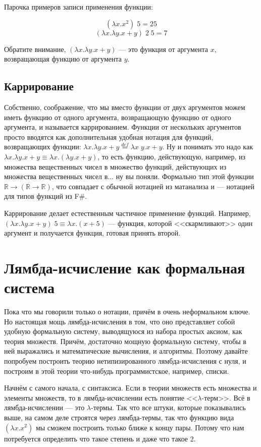 \documentclass[a5paper]{article}
\begin{document}
Парочка примеров записи применения функции:

$$(\lambda x.x^2) \; 5 = 25$$
$$(\lambda x.\lambda y.x + y) \; 2 \; 5 = 7$$

Обратите внимание, $(\lambda x.\lambda y.x + y)$ --- это функция от аргумента $x$, возвращающая функцию от аргумента $y$.

\subsection{Каррирование}

Собственно, соображение, что мы вместо функции от двух аргументов можем иметь функцию от одного аргумента, возвращающую функцию от одного аргумента, и называется каррированием. Функции от нескольких аргументов просто вводятся как дополнительная удобная нотация для функций, возвращающих функции: $\lambda x.\lambda y.x + y \stackrel{def}{=} \lambda x \; y.x + y$. Ну и понимать это надо как $\lambda x.\lambda y.x + y \equiv \lambda x.(\lambda y.x + y)$, то есть функцию, действующую, например, из множества вещественных чисел в множество функций, действующих из множества вещественных чисел в... ну вы поняли. Формально тип этой функции $\mathbb{R} \rightarrow (\mathbb{R} \rightarrow \mathbb{R})$, что совпадает с обычной нотацией из матанализа и --- нотацией для типов функций из F\#.

Каррирование делает естественным частичное применение функций. Например, $(\lambda x.\lambda y.x + y) \; 5 \equiv \lambda x.(x + 5)$ --- функция, которой <<скармливают>> один аргумент и получается функция, готовая принять второй.

\section{Лямбда-исчисление как формальная система}

Пока что мы говорили только о нотации, причём в очень неформальном ключе. Но настоящая мощь лямбда-исчисления в том, что оно представляет собой удобную формальную систему, выводящуюся из набора простых аксиом, как теория множеств. Причём, достаточно мощную формальную систему, чтобы в ней выражались и математические вычисления, и алгоритмы. Поэтому давайте попробуем построить теорию нетипизированного лямбда-исчисления с нуля, и построим в этой теории что-нибудь программистское, например, списки.

Начнём с самого начала, с синтаксиса. Если в теории множеств есть множества и элементы множеств, то в лямбда-исчислении есть понятие <<$\lambda$-терм>>. Всё в лямбда-исчислении --- это $\lambda$-термы. Так что все штуки, которые показывались выше, на самом деле строятся через лямбда-термы, так что функцию вида $(\lambda x.x^2)$ мы сможем построить только ближе к концу пары. Потому что нам потребуется определить что такое степень и даже что такое 2. 
\end{document}
